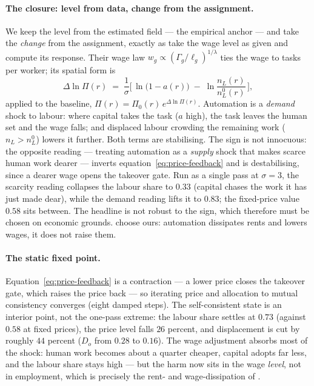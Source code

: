 \documentclass[12pt, a4paper]{article}
\begin{document}
\paragraph{The closure: level from data, change from the assignment.}
We keep the level from the estimated field --- the empirical anchor --- and take
the \emph{change} from the assignment, exactly as \textcite{acemoglu2024rents}
take the wage level as given and compute its response. Their wage law
$w_g \propto (\Gamma_g/\ell_g)^{1/\lambda}$ ties the wage to tasks per worker;
its spatial form is
\begin{equation}
  \Delta \ln \Pi(r) \;=\; \frac{1}{\sigma}\Big[\,\ln\big(1-a(r)\big) \;-\; \ln\frac{n_L(r)}{n_L^0(r)}\,\Big],
  \label{eq:price-feedback}
\end{equation}
applied to the baseline, $\Pi(r) = \Pi_0(r)\,e^{\Delta\ln\Pi(r)}$. Automation is a
\emph{demand} shock to labour: where capital takes the task ($a$ high), the task
leaves the human set and the wage falls; and displaced labour crowding the
remaining work ($n_L > n_L^0$) lowers it further. Both terms are stabilising. The
sign is not innocuous: the opposite reading --- treating automation as a
\emph{supply} shock that makes scarce human work dearer --- inverts
equation~\eqref{eq:price-feedback} and is destabilising, since a dearer wage
opens the takeover gate. Run as a single pass at $\sigma = 3$, the scarcity
reading collapses the labour share to $0.33$ (capital chases the work it has just
made dear), while the demand reading lifts it to $0.83$; the fixed-price value
$0.58$ sits between. The headline is not robust to the sign, which therefore must
be chosen on economic grounds. \textcite{acemoglu2024rents} choose ours:
automation dissipates rents and lowers wages, it does not raise them.

\paragraph{The static fixed point.}
Equation~\eqref{eq:price-feedback} is a contraction --- a lower price closes the
takeover gate, which raises the price back --- so iterating price and allocation
to mutual consistency converges (eight damped steps). The self-consistent state
is an interior point, not the one-pass extreme: the labour share settles at
$0.73$ (against $0.58$ at fixed prices), the price level falls $26$ percent, and
displacement is cut by roughly $44$ percent ($D_o$ from $0.28$ to $0.16$). The
wage adjustment absorbs most of the shock: human work becomes about a quarter
cheaper, capital adopts far less, and the labour share stays high --- but the
harm now sits in the wage \emph{level}, not in employment, which is precisely the
rent- and wage-dissipation of \textcite{acemoglu2024rents}.
\end{document}
